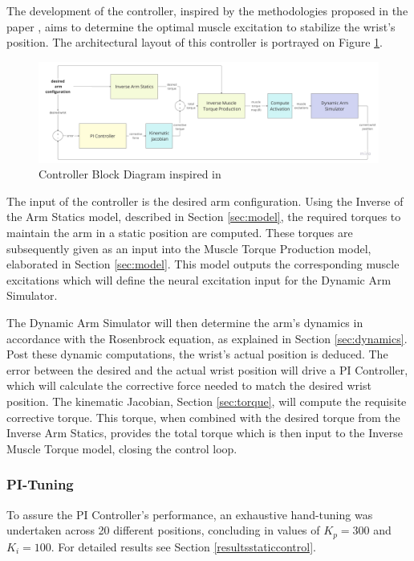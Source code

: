 The development of the controller, inspired by the methodologies proposed in the paper \cite{QSC}, aims to determine the optimal muscle excitation to stabilize the wrist's position. The architectural layout of this controller is portrayed on Figure \ref{fig:BDC}.

\begin{figure}[h!]
    \centering
    \includegraphics[width=1\textwidth]{Pictures/Controller/controller-diagram.jpg}
    \caption{Controller Block Diagram inspired in \cite{QSC}}
    \label{fig:BDC}
\end{figure}

The input of the controller is the desired arm configuration. Using the Inverse of the Arm Statics model, described in Section \ref{sec:model}, the required torques to maintain the arm in a static position are computed. These torques are subsequently given as an input into the Muscle Torque Production model, elaborated in Section \ref{sec:model}. This model outputs the corresponding muscle excitations which will define the neural excitation input for the Dynamic Arm Simulator. 

The Dynamic Arm Simulator will then determine the arm's dynamics in accordance with the Rosenbrock equation, as explained in Section \ref{sec:dynamics}. Post these dynamic computations, the wrist's actual position is deduced. The error between the desired and the actual wrist position will drive a PI Controller, which will calculate the corrective force needed to match the desired wrist position. The kinematic Jacobian, Section \ref{sec:torque}, will compute the requisite corrective torque. This torque, when combined with the desired torque from the Inverse Arm Statics, provides the total torque which is then input to the Inverse Muscle Torque model, closing the control loop. 


\subsubsection{PI-Tuning}
To assure the PI Controller's performance, an exhaustive hand-tuning was undertaken across 20 different positions, concluding in values of \(K_p = 300\) and \(K_i = 100\). For detailed results see Section \ref{resultsstaticcontrol}.

